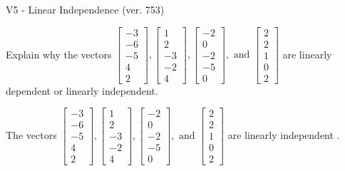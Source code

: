\begin{exercise}
  \begin{exerciseTitle}V5 - Linear Independence (ver. 753)\end{exerciseTitle}
  \begin{exerciseStatement}
    Explain why the vectors \(\left[\begin{array}{r}
-3 \\
-6 \\
-5 \\
4 \\
2
\end{array}\right] , \left[\begin{array}{r}
1 \\
2 \\
-3 \\
-2 \\
4
\end{array}\right] , \left[\begin{array}{r}
-2 \\
0 \\
-2 \\
-5 \\
0
\end{array}\right] , \text{ and } \left[\begin{array}{r}
2 \\
2 \\
1 \\
0 \\
2
\end{array}\right]\) are linearly dependent or linearly independent.	


  \end{exerciseStatement}
  \begin{exerciseAnswer}
   The vectors \(\left[\begin{array}{r}
-3 \\
-6 \\
-5 \\
4 \\
2
\end{array}\right] , \left[\begin{array}{r}
1 \\
2 \\
-3 \\
-2 \\
4
\end{array}\right] , \left[\begin{array}{r}
-2 \\
0 \\
-2 \\
-5 \\
0
\end{array}\right] , \text{ and } \left[\begin{array}{r}
2 \\
2 \\
1 \\
0 \\
2
\end{array}\right]\) are 
  	 linearly independent  .
  


  \end{exerciseAnswer}
\end{exercise}